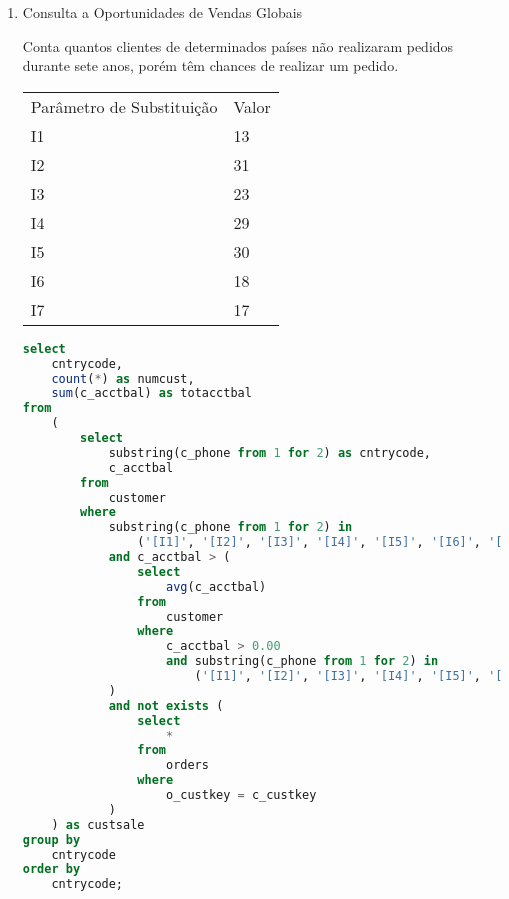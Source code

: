 \begin{enumerate}





\item Consulta a Oportunidades de Vendas Globais

Conta quantos clientes de determinados países não realizaram pedidos durante sete anos, porém têm chances de realizar um pedido.

\begin{tabular}{ll}
	Parâmetro de Substituição & Valor\\
	I1 & 13 \\
	I2 & 31 \\
	I3 & 23 \\
	I4 & 29 \\
	I5 & 30 \\
	I6 & 18 \\
	I7 & 17 \\
\end{tabular}

	\begin{lstlisting}[language=SQL]
select
	cntrycode,
	count(*) as numcust,
	sum(c_acctbal) as totacctbal
from
	(
		select
			substring(c_phone from 1 for 2) as cntrycode,
			c_acctbal
		from
			customer
		where
			substring(c_phone from 1 for 2) in
				('[I1]', '[I2]', '[I3]', '[I4]', '[I5]', '[I6]', '[I7]')
			and c_acctbal > (
				select
					avg(c_acctbal)
				from
					customer
				where
					c_acctbal > 0.00
					and substring(c_phone from 1 for 2) in
						('[I1]', '[I2]', '[I3]', '[I4]', '[I5]', '[I6]', '[I7]')
			)
			and not exists (
				select
					*
				from
					orders
				where
					o_custkey = c_custkey
			)
	) as custsale
group by
	cntrycode
order by
	cntrycode;
	

\end{lstlisting}
\end{enumerate}
